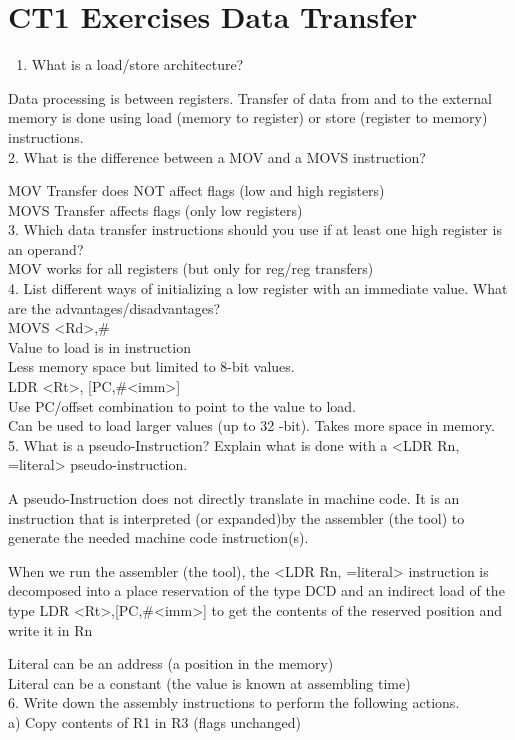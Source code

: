 \documentclass[10pt]{article}
\begin{document}
\section*{CT1 Exercises Data Transfer}
\begin{enumerate}
  \item What is a load/store architecture?
\end{enumerate}

Data processing is between registers. Transfer of data from and to the external memory is done using load (memory to register) or store (register to memory) instructions.\\
2. What is the difference between a MOV and a MOVS instruction?

MOV Transfer does NOT affect flags (low and high registers)\\
MOVS Transfer affects flags (only low registers)\\
3. Which data transfer instructions should you use if at least one high register is an operand?\\
MOV works for all registers (but only for reg/reg transfers)\\
4. List different ways of initializing a low register with an immediate value. What are the advantages/disadvantages?\\
MOVS <Rd>,\#<imm8>\\
Value to load is in instruction\\
Less memory space but limited to 8-bit values.\\
LDR <Rt>, [PC,\#<imm>]\\
Use PC/offset combination to point to the value to load.\\
Can be used to load larger values (up to 32 -bit). Takes more space in memory.\\
5. What is a pseudo-Instruction? Explain what is done with a <LDR Rn, =literal> pseudo-instruction.

A pseudo-Instruction does not directly translate in machine code. It is an instruction that is interpreted (or expanded)by the assembler (the tool) to generate the needed machine code instruction(s).

When we run the assembler (the tool), the <LDR Rn, =literal> instruction is decomposed into a place reservation of the type DCD and an indirect load of the type LDR <Rt>,[PC,\#<imm>] to get the contents of the reserved position and write it in Rn

Literal can be an address (a position in the memory)\\
Literal can be a constant (the value is known at assembling time)\\
6. Write down the assembly instructions to perform the following actions.\\
a) Copy contents of R1 in R3 (flags unchanged)
\end{document}
